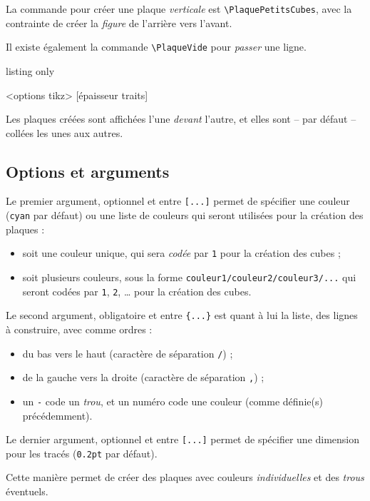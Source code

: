 \documentclass[french,a4paper,11pt]{article}
\begin{document}
\begin{cautionblock}
La commande pour créer une plaque \textit{verticale} est \texttt{\textbackslash PlaquePetitsCubes}, avec la contrainte de créer la \textit{figure} de l'arrière vers l'avant.

Il existe également la commande \texttt{\textbackslash PlaqueVide} pour \textit{passer} une ligne.
\end{cautionblock}

\begin{PresCodeTex}{listing only}
\begin{EmpilementCubes}[échelle]<options tikz>
	[épaisseur traits]
	\PlaqueVide[nb]
\end{EmpilementCubes}
\end{PresCodeTex}

\begin{importantblock}
Les plaques créées sont affichées l'une \textit{devant} l'autre, et elles sont -- par défaut -- collées les unes aux autres.
\end{importantblock}

\subsection{Options et arguments}

\begin{tipblock}
Le premier argument, optionnel et entre \texttt{[...]} permet de spécifier une couleur (\texttt{cyan} par défaut) ou une liste de couleurs qui seront utilisées pour la création des plaques :

\begin{itemize}
	\item soit une couleur unique, qui sera \textit{codée} par \texttt{1} pour la création des cubes ;
	\item soit plusieurs couleurs, sous la forme \texttt{couleur1/couleur2/couleur3/...} qui seront codées par \texttt{1}, \texttt{2}, \ldots{} pour la création des cubes.
\end{itemize}

Le second argument, obligatoire et entre \texttt{\{...\}} est quant à lui la liste, des lignes à construire, avec comme ordres :

\begin{itemize}
	\item du bas vers le haut (caractère de séparation \texttt{/}) ;
	\item de la gauche vers la droite (caractère de séparation \texttt{,}) ;
	\item un \texttt{-} code un \textit{trou}, et un numéro code une couleur (comme définie(s) précédemment).
\end{itemize}

Le dernier argument, optionnel et entre \texttt{[...]} permet de spécifier une dimension pour les tracés (\texttt{0.2pt} par défaut).

\medskip

Cette manière permet de créer des plaques avec couleurs \textit{individuelles} et des \textit{trous} éventuels.
\end{tipblock}
\end{document}
